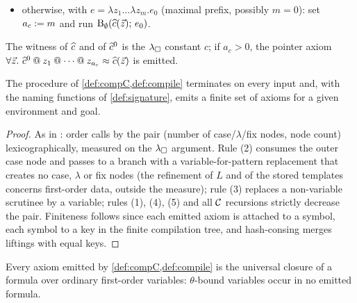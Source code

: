 \begin{definition}
\begin{itemize}[leftmargin=2em]
  (maximal prefix): set $a_c \defeq m$ and run
  $\mathrm{B}_{[g_0 \mapsto (\Ihat{c},\, (),\, m)]}(\Ihat{c}(\tup{z});\,
  e_0)$ --- the pointer value of $g_0$ is the constant $\Ihat{c}^0$,
  which exists since $m \geq 1$ (the guard argument of a fix is
  informative);
\item otherwise, with $e = \lambda z_1 \dots \lambda z_m.e_0$ (maximal
  prefix, possibly $m = 0$): set $a_c \defeq m$ and run
  $\mathrm{B}_{\emptyset}(\widehat{c}(\vec{z});\, e_0)$.
\end{itemize}
The witness of $\widehat{c}$ and of $\Ihat{c}^0$ is the $\lambda_{\square}$ constant
$c$; if $a_c > 0$, the pointer axiom $\forall \tup{z}.\ \Ihat{c}^0 \fapp
z_1 \fapp \cdots \fapp z_{a_c} \feq \Ihat{c}(\tup{z})$ is emitted.
\end{definition}

\begin{lemma}
\label{lem:compile-term}
The procedure of \cref{def:compC,def:compile} terminates on every input
and, with the naming functions of \cref{def:signature}, emits a finite
set of axioms for a given environment and goal.
\end{lemma}

\begin{proof}
As in \cite{Extraction2026}: order calls by the pair (number of
case/$\lambda$/fix nodes, node count) lexicographically, measured on
the $\lambda_{\square}$ argument.  Rule (2) consumes the outer case node and
passes to a branch with a variable-for-pattern replacement that
creates no case, $\lambda$ or fix nodes (the refinement of $L$ and of
the stored templates concerns first-order data, outside the measure);
rule (3) replaces a non-variable scrutinee by a variable; rules (1),
(4), (5) and all $\mathcal{C}$ recursions strictly decrease the pair.
Finiteness follows since each emitted axiom is attached to a symbol,
each symbol to a key in the finite compilation tree, and hash-consing
merges liftings with equal keys.
\end{proof}

\begin{lemma}
\label{lem:sentences}
Every axiom emitted by \cref{def:compC,def:compile} is the universal
closure of a formula over ordinary first-order variables:
$\theta$-bound variables occur in no emitted formula.
\end{lemma}

